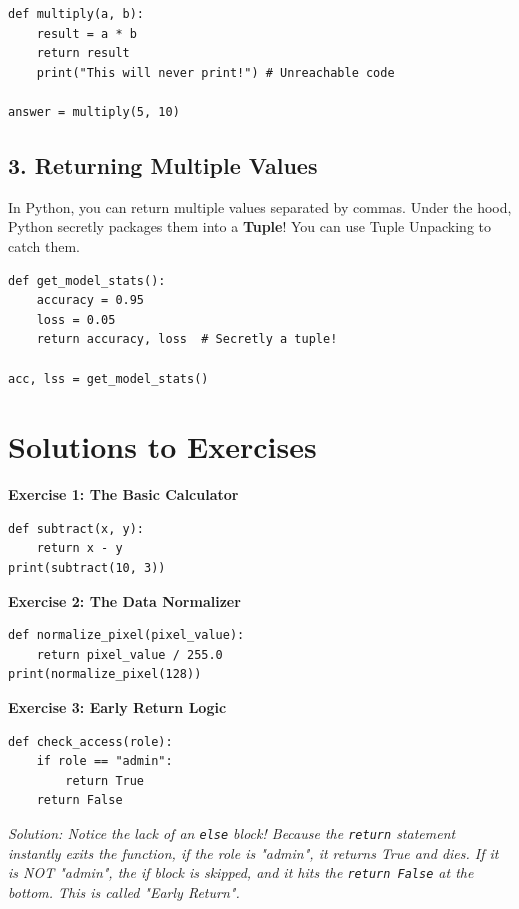
\begin{lstlisting}
def multiply(a, b):
    result = a * b
    return result
    print("This will never print!") # Unreachable code

answer = multiply(5, 10)
\end{lstlisting}

\subsection{3. Returning Multiple Values}
In Python, you can return multiple values separated by commas. Under the hood, Python secretly packages them into a \textbf{Tuple}! You can use Tuple Unpacking to catch them.

\begin{lstlisting}
def get_model_stats():
    accuracy = 0.95
    loss = 0.05
    return accuracy, loss  # Secretly a tuple!

acc, lss = get_model_stats()
\end{lstlisting}


\section{Solutions to Exercises}

\textbf{Exercise 1: The Basic Calculator}
\begin{lstlisting}
def subtract(x, y):
    return x - y
print(subtract(10, 3))
\end{lstlisting}

\vspace{1em}
\textbf{Exercise 2: The Data Normalizer}
\begin{lstlisting}
def normalize_pixel(pixel_value):
    return pixel_value / 255.0
print(normalize_pixel(128))
\end{lstlisting}

\vspace{1em}
\textbf{Exercise 3: Early Return Logic}
\begin{lstlisting}
def check_access(role):
    if role == "admin":
        return True
    return False
\end{lstlisting}
\textit{Solution: Notice the lack of an \texttt{else} block! Because the \texttt{return} statement instantly exits the function, if the role is "admin", it returns True and dies. If it is NOT "admin", the if block is skipped, and it hits the \texttt{return False} at the bottom. This is called "Early Return".}

